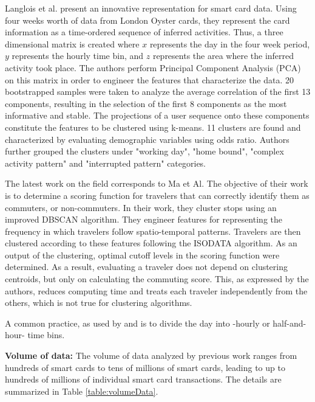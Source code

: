 \documentclass{article}
\begin{document}
Langlois et al. \cite{langlois2016inferring} present an innovative representation for smart card data. Using four weeks worth of data from London Oyster cards, they represent the card information as a time-ordered sequence of inferred activities. Thus, a three dimensional matrix is created where $x$ represents the day in the four week period, $y$ represents the hourly time bin, and $z$ represents the area where the inferred activity took place. The authors perform Principal Component Analysis (PCA) on this matrix in order to engineer the features that characterize the data. 20 bootstrapped samples were taken to analyze the average correlation of the first 13 components, resulting in the selection of the first 8 components as the most informative and stable. The projections of a user sequence onto these components constitute the features to be clustered using k-means. 11 clusters are found and characterized by evaluating demographic variables using odds ratio. Authors further grouped the clusters under "working day", "home bound", "complex activity pattern" and "interrupted pattern" categories. 

The latest work on the field corresponds to Ma et Al. \cite{ma2017understanding} The objective of their work is to determine a scoring function for travelers that can correctly identify them as commuters, or non-commuters. In their work, they cluster stops using an improved DBSCAN algorithm. They engineer features for representing the frequency in which travelers follow spatio-temporal patterns. Travelers are then clustered according to these features following the ISODATA algorithm. As an output of the clustering, optimal cutoff levels in the scoring function were determined. As a result, evaluating a traveler does not depend on clustering centroids, but only on calculating the commuting score. This, as expressed by the authors, reduces computing time and treats each traveler independently from the others, which is not true for clustering algorithms.

A common practice, as used by \cite{ma2017understanding} and \cite{langlois2016inferring} is to divide the day into -hourly or half-and-hour- time bins.

\textbf{Volume of data:}
The volume of data analyzed by previous work ranges from hundreds of smart cards to tens of millions of smart cards, leading to up to hundreds of millions of individual smart card transactions. The details are summarized in Table \ref{table:volumeData}.
 
\end{document}
